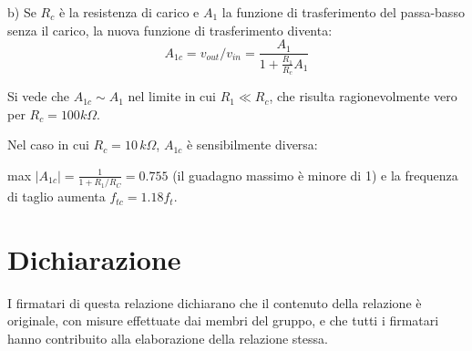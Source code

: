 \documentclass[10pt,a4paper]{article}
\begin{document}
b)  Se $R_c$ è la resistenza di carico e $A_1$ la funzione di trasferimento del passa-basso senza il carico,  la nuova funzione di trasferimento diventa:
\[ A_{1c} = v_{out}/v_{in}= \frac{A_1}{1+\frac{R_1}{R_c}A_1}\]

Si vede che $A_{1c} \sim A_{1}$ nel limite in cui $R_1 \ll R_c$, che risulta ragionevolmente vero per $R_c = 100 k\Omega$.

Nel caso in cui $R_c = 10 \, k\Omega$, $A_{1c}$ è sensibilmente diversa: 

max $|A_{1c}|= \frac{1}{1+R_1/R_C}=0.755$ (il guadagno massimo è minore di 1) e la frequenza di taglio  aumenta $f_{tc}= 1.18 f_{t}$.



\section*{Dichiarazione}
I firmatari di questa relazione dichiarano che il contenuto della relazione \`e originale, con misure effettuate dai membri del gruppo, e che tutti i firmatari hanno contribuito alla elaborazione della relazione stessa.
\end{document}
